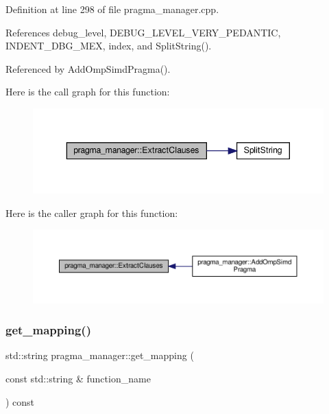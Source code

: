 Definition at line 298 of file pragma\+\_\+manager.\+cpp.



References debug\+\_\+level, D\+E\+B\+U\+G\+\_\+\+L\+E\+V\+E\+L\+\_\+\+V\+E\+R\+Y\+\_\+\+P\+E\+D\+A\+N\+T\+IC, I\+N\+D\+E\+N\+T\+\_\+\+D\+B\+G\+\_\+\+M\+EX, index, and Split\+String().



Referenced by Add\+Omp\+Simd\+Pragma().

Here is the call graph for this function\+:
\nopagebreak
\begin{figure}[H]
\begin{center}
\leavevmode
\includegraphics[width=343pt]{d2/d1d/classpragma__manager_a5e065372e3faa9eac004888ad14c95f4_cgraph}
\end{center}
\end{figure}
Here is the caller graph for this function\+:
\nopagebreak
\begin{figure}[H]
\begin{center}
\leavevmode
\includegraphics[width=350pt]{d2/d1d/classpragma__manager_a5e065372e3faa9eac004888ad14c95f4_icgraph}
\end{center}
\end{figure}
\mbox{\label{classpragma__manager_a21204318c4555fe290a13ba900ee661f}} 
\subsubsection{\texorpdfstring{get\+\_\+mapping()}{get\_mapping()}}
{\footnotesize\ttfamily std\+::string pragma\+\_\+manager\+::get\+\_\+mapping (\begin{DoxyParamCaption}\item[{const std\+::string \&}]{function\+\_\+name }\end{DoxyParamCaption}) const}



